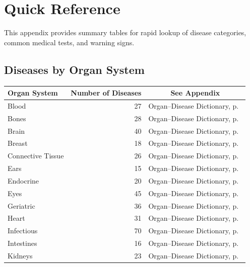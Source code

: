 \chapter*{Quick Reference}

This appendix provides summary tables for rapid lookup of disease
categories, common medical tests, and warning signs.

\section*{Diseases by Organ System}
\label{sec:quickref_organs}

\begin{tabularx}{\textwidth}{lrc}
\toprule
\textbf{Organ System} & \textbf{Number of Diseases} & \textbf{See Appendix} \\
\midrule
Blood                & 27  & Organ--Disease Dictionary, p.~\pageref{sec:organ_blood} \\
Bones                & 28  & Organ--Disease Dictionary, p.~\pageref{sec:organ_bones} \\
Brain                & 40  & Organ--Disease Dictionary, p.~\pageref{sec:organ_brain} \\
Breast               & 18  & Organ--Disease Dictionary, p.~\pageref{sec:organ_breast} \\
Connective Tissue    & 26  & Organ--Disease Dictionary, p.~\pageref{sec:organ_connective} \\
Ears                 & 15  & Organ--Disease Dictionary, p.~\pageref{sec:organ_ears} \\
Endocrine            & 20  & Organ--Disease Dictionary, p.~\pageref{sec:organ_endocrine} \\
Eyes                 & 45  & Organ--Disease Dictionary, p.~\pageref{sec:organ_eyes} \\
Geriatric            & 36  & Organ--Disease Dictionary, p.~\pageref{sec:organ_geriatric} \\
Heart                & 31  & Organ--Disease Dictionary, p.~\pageref{sec:organ_heart} \\
Infectious           & 70  & Organ--Disease Dictionary, p.~\pageref{sec:organ_infectious} \\
Intestines           & 16  & Organ--Disease Dictionary, p.~\pageref{sec:organ_intestines} \\
Kidneys              & 23  & Organ--Disease Dictionary, p.~\pageref{sec:organ_kidneys} \\

\end{tabularx}
